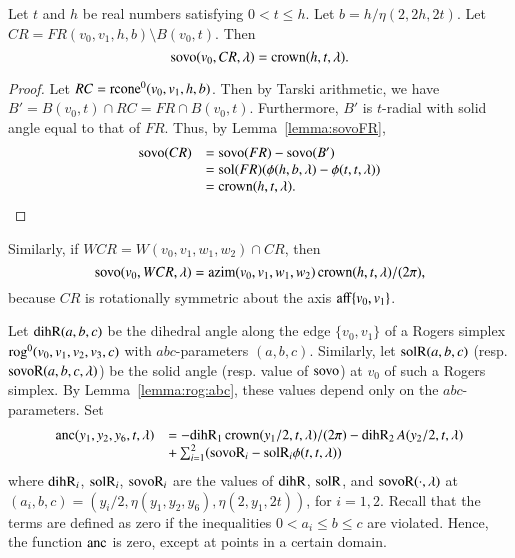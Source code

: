 \begin{lemma}\label{lemma:sovo:CR} 
Let $t$ and $h$ be real numbers satisfying 
$0 < t \le h$.
Let $b=h/\eta(2,2h,2t)$.
Let $CR=FR(v_0,v_1,h,b) \setminus B(v_0,t)$.
  Then
$${\operatorname{sovo}}(v_0,CR,\lambda) = \operatorname{crown}(h,t,\lambda).$$
\end{lemma}

\begin{proof}  Let $RC={\operatorname{rcone}}^0(v_0,v_1,h,b)$.
Then by Tarski arithmetic, we have
$B' = B(v_0,t)\cap RC = FR\cap B(v_0,t)$.
Furthermore, $B'$ is $t$-radial with solid angle equal to that
of $FR$.  Thus, by Lemma~\ref{lemma:sovoFR},
$$
\begin{array}{lll}
{\operatorname{sovo}}(CR) &= {\operatorname{sovo}}(FR) - {\operatorname{sovo}}(B')\\
 &= {\operatorname{sol}}(FR) (\phi(h,b,\lambda) - \phi(t,t,\lambda))\\
 &= \operatorname{crown}(h,t,\lambda).
\end{array}
$$
\end{proof}

Similarly, if $WCR = W(v_0,v_1,w_1,w_2) \cap CR$, then
$$
{\operatorname{sovo}}(v_0,WCR,\lambda) = {\operatorname{azim}}(v_0,v_1,w_1,w_2)\operatorname{crown}(h,t,\lambda)/(2\pi),
$$
because $CR$ 
is rotationally symmetric about the axis ${\operatorname{aff}}\{v_0,v_1\}$.



Let ${\operatorname{dihR}}(a,b,c)$ be the dihedral angle along the edge
$\{v_0,v_1\}$ of a
Rogers simplex ${\operatorname{rog}}^0(v_0,v_1,v_2,v_3,c)$ with $abc$-parameters
$(a,b,c)$.  Similarly, let ${\operatorname{solR}}(a,b,c)$ (resp. ${\operatorname{sovoR}}(a,b,c,\lambda)$)
be the solid angle (resp. value of ${\operatorname{sovo}}$)
at $v_0$ of such a Rogers simplex.  By Lemma~\ref{lemma:rog:abc},
these values depend only on the $abc$-parameters.
Set
    \begin{equation}
    \begin{array}{lll}
    \anc(y_1,y_2,y_6,t,\lambda) &= 
     -\op{dihR}_1\cro(y_1/2,t,\lambda)/(2\pi)
    -\op{dihR}_2\, A(y_2/2,t,\lambda) \\
      &+\sum_{i=1}^2 (\op{sovoR}_i - \op{solR}_i \phi(t,t,\lambda))\\
    \tlabel{eqn:4.5}
    \end{array}
    \end{equation}
where ${\operatorname{dihR}}_i$, ${\operatorname{solR}}_i$, ${\operatorname{sovoR}}_i$ are the values
of ${\operatorname{dihR}}$, ${\operatorname{solR}}$, and ${\operatorname{sovoR}}(\cdot,\lambda)$
at $(a_i,b,c) = (y_i/2,\eta(y_1,y_2,y_6),\eta(2,y_1,2t))$, for $i=1,2$.
Recall that the terms are defined as zero if the inequalities
$0 < a_i \le b\le c$ are violated.  Hence, the function $\operatorname{anc}$ is
zero, except at points in a certain domain.

